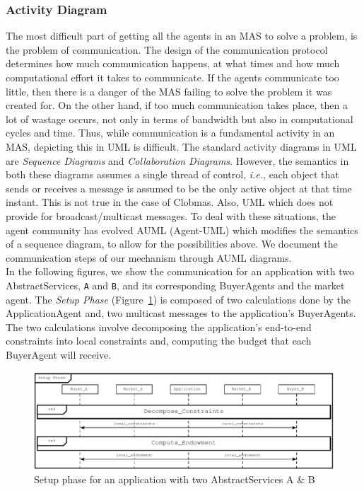 \documentclass[10pt,journal,compsoc]{IEEEtran}
\begin{document}
\subsubsection{Activity Diagram} The most difficult part of getting all the agents in an MAS to solve a problem, is the problem of communication. The design of the communication protocol determines how much communication happens, at what times and how much computational effort it takes to communicate. If the agents communicate too little, then there is a danger of the MAS failing to solve the problem it was created for. On the other hand, if too much communication takes place, then a lot of wastage occurs, not only in terms of bandwidth but also in computational cycles and time. Thus, while communication is a fundamental activity in an MAS, depicting this in UML is difficult. The standard activity diagrams in UML are \textit{Sequence Diagrams} and \textit{Collaboration Diagrams}. However, the semantics in both these diagrams assumes a single thread of control, \textit{i.e.}, each object that sends or receives a message is assumed to be the only active object at that time instant. This is not true in the case of Clobmas.  Also, UML which does not provide for broadcast/multicast messages. To deal with these situations, the agent community has evolved AUML (Agent-UML) which modifies the semantics of a sequence diagram, to allow for the possibilities above. We document the communication steps of our mechanism through AUML diagrams.\\
In the following figures, we show the communication for an application with two AbstractServices, \texttt{A} and \texttt{B}, and its corresponding BuyerAgents and the market agent. The \emph{Setup Phase} (Figure~\ref{fig:setup_phase}) is composed of two calculations done by the ApplicationAgent and, two multicast messages to the application's BuyerAgents. The two calculations involve decomposing the application's end-to-end constraints into local constraints and, computing the budget that each BuyerAgent will receive.
\begin{figure}[h]
\centering
\includegraphics[scale=0.7]{drawings/setup_phase.pdf}
\caption{Setup phase for an application with two AbstractServices A \& B \label{fig:setup_phase}}
\end{figure}
\end{document}
